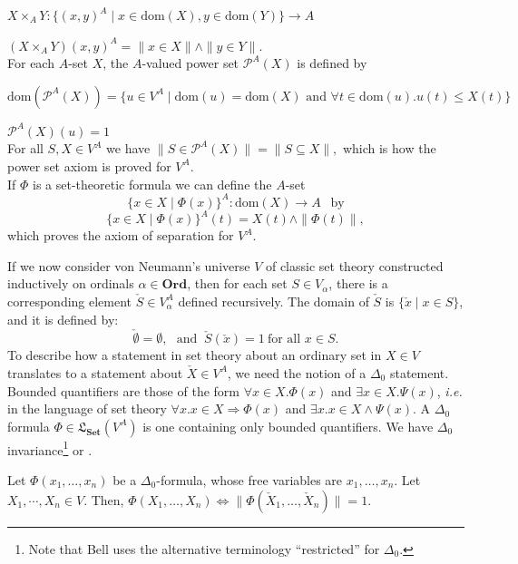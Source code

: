 \documentclass{lmcs}
\newcommand{\dom}{\ensuremath{\mathrm{dom}}}
\newcommand{\Set}{\cat{Set}}
\newcommand{\cat}[1]{\ensuremath{\mathbf{#1}}}
\newcommand{\Ord}{\cat{Ord}}
\newcommand{\powerset}{\ensuremath{\mathcal{P}}}
\newcommand{\If}{\mathbf{if}}
\newcommand{\Lang}{\mathfrak{L}}
\newcommand{\apowerset}{\powerset^A}
\newcommand{\atimes}{\mathrel{\times_{\!A}}}
\begin{document}
$X \atimes Y : \{ (x,y)^A \mid x \in \dom(X), y \in \dom(Y) \} \rightarrow A$

	$(X \atimes Y)(x,y)^A = \| x \in X \| \land \| y \in Y \|.$
\\For each $A$-set $X$, the $A$-valued power set $\apowerset(X)$ is defined by

	$\dom(\apowerset(X)) = \{ u \in V^A \mid \dom(u) = \dom(X) \text{ and } \forall t \in \dom(u) . u(t) \leq X(t) \}$ 
	
	$\apowerset(X)(u) = 1$
\\For all $S, X \in V^A$ we have
$
\| S \in \apowerset(X) \| = \| S \subseteq X \|,
$
which is how the power set axiom is proved for $V^A$. 
%
\\If $\Phi$ is a set-theoretic formula we can define the $A$-set
$$\{ x \in X \mid \Phi(x) \}^A : \dom(X) \rightarrow A~~\text{ by}$$ $$\{ x \in X \mid \Phi(x) \}^A(t) = X(t) \land \| \Phi(t) \|,$$
which proves the axiom of separation for $V^A$. 

If we now consider von Neumann's universe $V$ of classic set theory constructed inductively on ordinals $\alpha \in \Ord$, then for each set $S \in V_\alpha$, there is a corresponding element $\check{S} \in V^A_\alpha$ defined recursively. The domain of $\check{S}$ is $\{\check{x} \mid x \in S \}$, and it is defined by:
$$	\check{\emptyset} = \emptyset,~~~\text{and }~
	\check{S}(\check{x}) = 1 ~ \text{for all } x \in S.$$
To describe how a statement in set theory about an ordinary set in $X \in V$ translates to a statement about $\check{X} \in V^A$, we need the notion of a $\Delta_0$ statement. Bounded quantifiers are those of the form $\forall x \in X. \Phi(x)$ and $\exists x \in X . \Psi(x)$, \emph{i.e.} in the language of set theory $\forall x. x \in X \Rightarrow \Phi(x)$ and $\exists x . x \in X \land \Psi(x)$. A $\Delta_0$ formula $\Phi \in \Lang_\Set(V^A)$ is one containing only bounded quantifiers. We have $\Delta_0$ invariance\footnote{Note that Bell uses the alternative terminology ``restricted'' for $\Delta_0$.} \cite[Lemma 14.21]{jech} or \cite[Theorem 1.23 (v)]{bell}.

\begin{thm}
	\label{DeltaNoughtMetaTheorem}
	Let $\Phi(x_1,\ldots,x_n)$ be a $\Delta_0$-formula, whose free variables are $x_1, \ldots, x_n$. Let $X_1,\cdots,X_n \in V$. Then,
	$
	\Phi(X_1,\ldots,X_n) \Leftrightarrow \| \Phi(\check{X}_1, \ldots, \check{X}_n) \| = 1.
	$
\end{thm}
\end{document}
